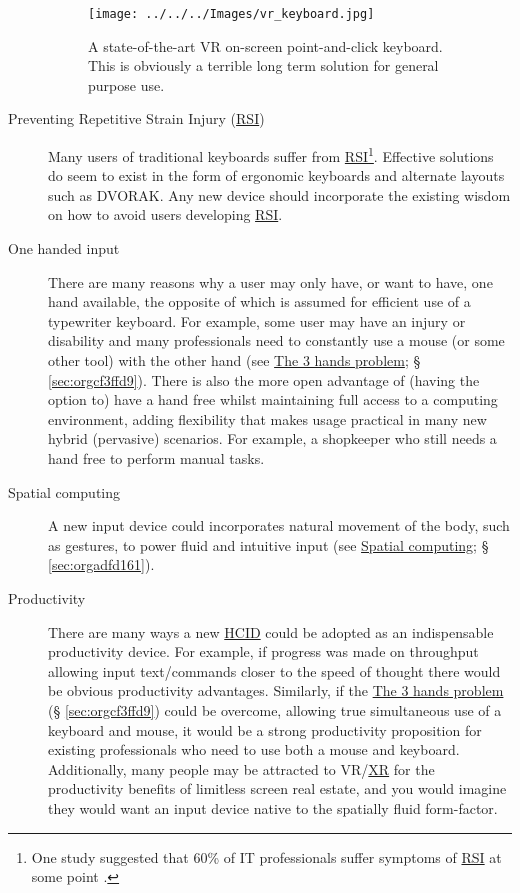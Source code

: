\documentclass[logo,bsc,singlespacing,parskip]{infthesis}
\begin{document}
\begin{description}
\begin{figure}[h]
\centering
\texttt{[image: ../../../Images/vr\_keyboard.jpg]}
\caption[VR point-and-click on-screen keybaord]{\label{fig:virtual_keyboard}A state-of-the-art VR on-screen point-and-click keyboard. This is obviously a terrible long term solution for general purpose use.}
\end{figure}
\item[{Preventing Repetitive Strain Injury (\hyperref[org503fc2d]{RSI})}] Many users of traditional keyboards suffer from \hyperref[org503fc2d]{RSI}\footnote{One study suggested that 60\% of IT professionals suffer symptoms of \hyperref[org503fc2d]{RSI} at some point \autocite{namayandegiEVALUATIONMETHODWHICH2015}.}.
Effective solutions do seem to exist in the form of ergonomic keyboards and alternate layouts such as DVORAK.
Any new device should incorporate the existing wisdom on how to avoid users developing \hyperref[org503fc2d]{RSI}.

\item[{One handed input}] There are many reasons why a user may only have, or want to have, one hand available, the opposite of which is assumed for efficient use of a typewriter keyboard.
For example, some user may have an injury or disability and many professionals need to constantly use a mouse (or some other tool) with the other hand (see \hyperref[sec:orgcf3ffd9]{The 3 hands problem}; § \ref{sec:orgcf3ffd9}).
There is also the more open advantage of (having the option to) have a hand free whilst maintaining full access to a computing environment, adding flexibility that makes usage practical in many new hybrid (pervasive) scenarios.
For example, a shopkeeper who still needs a hand free to perform manual tasks.

\item[{Spatial computing}] A new input device could incorporates natural movement of the body, such as gestures, to power fluid and intuitive input (see \hyperref[sec:org4fdd9eb]{Spatial computing}; § \ref{sec:orgadfd161}).

\item[{Productivity}] There are many ways a new \hyperref[orgf95a76e]{HCID} could be adopted as an indispensable productivity device.
For example, if progress was made on throughput allowing input text/commands closer to the speed of thought there would be obvious productivity advantages.
Similarly, if the \hyperref[sec:orgcf3ffd9]{The 3 hands problem} (§ \ref{sec:orgcf3ffd9}) could be overcome, allowing true simultaneous use of a keyboard and mouse, it would be a strong productivity proposition for existing professionals who need to use both a mouse and keyboard.
Additionally, many people may be attracted to VR/\hyperref[org88b0f70]{XR} for the productivity benefits of limitless screen real estate, and you would imagine they would want an input device native to the spatially fluid form-factor.
\end{description}
\end{document}
